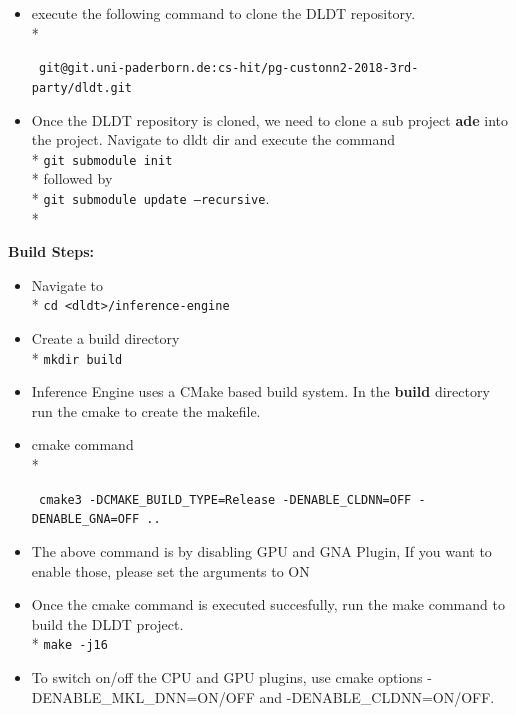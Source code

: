 \begin{itemize}
\item execute the following command to clone the DLDT repository. \\* \raggedright\texttt{ git@git.uni-paderborn.de:cs-hit/pg-custonn2-2018-3rd-party/dldt.git}   
\item Once the DLDT repository is cloned, we need to clone a sub project \textbf{ade} into the project. Navigate to dldt dir and execute the command \\* \texttt{git submodule init} \\*  followed by \\* \texttt{git submodule update --recursive}. \\* 
\end{itemize}

\textbf{Build Steps:}

\begin{itemize}
\item Navigate to \\* \texttt{cd <dldt>/inference-engine}
\item Create a build directory  \\* \texttt{mkdir build}
\item Inference Engine uses a CMake based build system. In the \textbf{build} directory run the cmake to create the makefile.
\item cmake command \\*  \raggedright\texttt{ cmake3 -DCMAKE\_BUILD\_TYPE=Release -DENABLE\_CLDNN=OFF -DENABLE\_GNA=OFF .. }
\item The above command is by disabling GPU and GNA Plugin, If you want to enable those, please set the arguments to ON
\item Once the cmake command is executed succesfully, run the make command to build the DLDT project. \\* \texttt{make -j16}
\item To switch on/off the CPU and GPU plugins, use cmake options -DENABLE\_MKL\_DNN=ON/OFF and -DENABLE\_CLDNN=ON/OFF.

\end{itemize}

